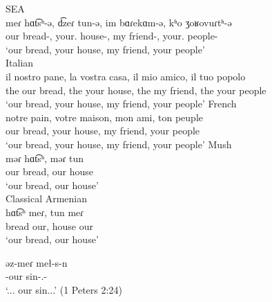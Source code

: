 \begin{exe}
	\ex \begin{xlist}
		\ex SEA \label{sent:Mush:morpho:noun:possDef:sea} \\ \gll
		meɾ hɑt͡sʰ-ə, d͡zeɾ tun-ə, im bɑɾekɑm-ə, kʰo ʒoʁovuɾtʰ-ə \\
		our bread-{}, your.{\pl} house-{}, my friend-{}, your.{\sg} people-{} \\
		\trans `our bread, your house, my friend, your people' \\ 
		\ex Italian\label{sent:Mush:morpho:noun:possDef:it} \\ \gll
		il nostro pane, la vostra casa, il mio amico, il tuo popolo
		\\ the our bread, the your house, the my friend, the your people \\
		\trans `our bread, your house, my friend, your people'
		\ex French\label{sent:Mush:morpho:noun:possDef:fr}\\ \gll 
		notre pain, votre maison, mon ami, ton peuple \\
		our bread, your house, my friend, your people\\
		\trans `our bread, your house, my friend, your people'
		\ex Mush \label{sent:Mush:morpho:noun:possDef:mush} \\ \gll
		məɾ hɑt͡sʰ, məɾ tun \\
		our bread, our house \\
		\trans `our bread, our house' \\
		\ex Classical Armenian \label{sent:Mush:morpho:noun:possDef:ca} \\ \gll
		hɑt͡sʰ meɾ, tun meɾ \\
		bread our, house our\\
			\trans `our bread, our house' \\
	\end{xlist}
\end{exe}


				\begin{exe}
						\ex \label{ex:mush:morph:noun:defCA}
			\gll əz-meɾ meł-s-n \\
		 {\acc}-our sin-{\acc}.{\pl}-{\dist} \\
			\trans `... our sin...' (1 Peters 2:24)\\
					\end{exe}


